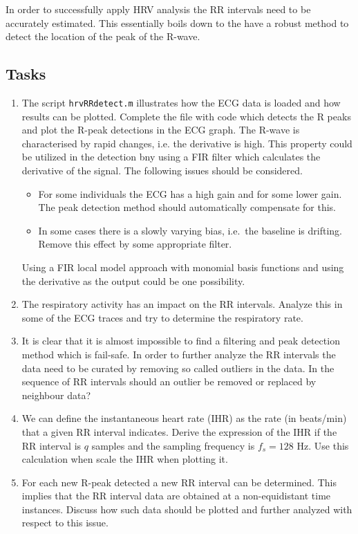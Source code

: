 \documentclass[12pt]{article}
\begin{document}
In order to successfully apply HRV analysis the RR intervals need to
be accurately estimated. This essentially boils down to the have a
robust method to detect the location of the peak of the R-wave.   

\subsection{Tasks}
\begin{enumerate}
\item The script \texttt{hrvRRdetect.m} illustrates how the ECG data
  is loaded and how results can be plotted. Complete the file with
  code which detects the R peaks and plot the R-peak detections in the
  ECG graph. The R-wave is characterised by rapid changes, i.e. the
  derivative is high. This property could be utilized in the detection
  bny using a FIR filter which calculates the derivative of the signal.  
  The following issues should be considered.
  \begin{itemize}
  \item For some individuals the ECG has a high gain and for some
    lower gain. The peak detection method should automatically
    compensate for this.
  \item In some cases there is a slowly varying bias, i.e.\ the
    baseline is drifting. Remove this effect by some appropriate filter.
  \end{itemize}
  Using a FIR local model approach with monomial basis functions and
  using the derivative as the output could be one possibility. 
\item The respiratory activity has an impact on the RR intervals. Analyze this in some of the ECG traces and try to determine
  the respiratory rate.   
\item It is clear that it is almost impossible to find a filtering
  and peak detection method which is fail-safe. In order to further analyze
  the RR intervals the data need to be curated by removing so called
  outliers in the data. In the sequence of RR intervals should an
  outlier be removed or replaced by neighbour data?
\item We can define the instantaneous heart rate (IHR) as the rate (in
  beats/min) that a given RR interval indicates. Derive the
  expression of the IHR if the RR interval is $q$ samples and the
  sampling frequency is $f_s=128$ Hz. Use this calculation when
  scale the IHR when plotting it. 
\item For each new R-peak detected a new RR interval can be
  determined. This implies that the RR interval data are obtained at a
  non-equidistant time instances. Discuss how such data should be
  plotted and further analyzed with respect to this issue. 
\end{enumerate}
\end{document}
